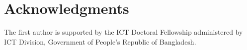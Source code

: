 \documentclass[unnumsec,webpdf,modern,large]{oup-authoring-template}
\theoremstyle{thmstyleone}%
\theoremstyle{thmstyletwo}%
\theoremstyle{thmstylethree}%
\begin{document}

%

\section{Acknowledgments}
The first author is supported by the ICT Doctoral Fellowship administered by ICT Division, Government of People’s Republic of Bangladesh.




\end{document}
